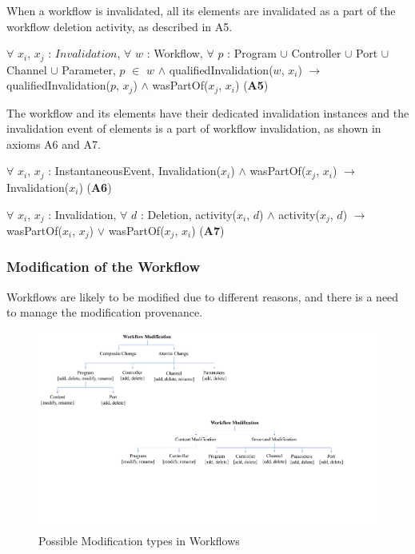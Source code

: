 \documentclass[ao]{iosart2x}
\begin{document}
When a workflow is invalidated, all its elements are invalidated as a part of the workflow deletion activity, as described in A5.

\begin{center}
    $\forall$ $x_i$, $x_j$ : $Invalidation$,
    $\forall$ $w$ : Workflow,
    $\forall$ $p$ : Program $\cup$ Controller $\cup$ Port $\cup$ Channel $\cup$ Parameter, 
    $p$ $\in$ $w$ $\wedge$ qualifiedInvalidation($w$, $x_i$) $\rightarrow$  qualifiedInvalidation($p$, $x_j$) $\wedge$ wasPartOf($x_j$, $x_i$) (\textbf{A5})
\end{center}


The workflow and its elements have their dedicated invalidation instances and the invalidation event of elements is a part of workflow invalidation, as shown in axioms A6 and A7.  

\begin{center}
    $\forall$ $x_i$, $x_j$ : InstantaneousEvent,
    Invalidation($x_i$) $\wedge$ wasPartOf($x_j$, $x_i$)  $\rightarrow$ Invalidation($x_i$)   (\textbf{A6})
\end{center}

\begin{center}
    $\forall$ $x_i$, $x_j$ : Invalidation,
    $\forall$ $d$ : Deletion,
    activity($x_i$, $d$) $\wedge$ activity($x_j$, $d$) $\rightarrow$  wasPartOf($x_i$, $x_j$) $\vee$ wasPartOf($x_j$, $x_i$) (\textbf{A7})
\end{center}



\subsubsection{Modification of the Workflow}
\label{subsec:workflow-modification}

Workflows are likely to be modified due to different reasons, and there is a need to manage the modification provenance. 
\begin{figure}[h]
    \centering
    \includegraphics[width=0.8\linewidth]{figures/workflow-modification.pdf}
    \caption{Possible Modification types in Workflows}
    \label{fig:workflow-modification}
\end{figure}
\end{document}
